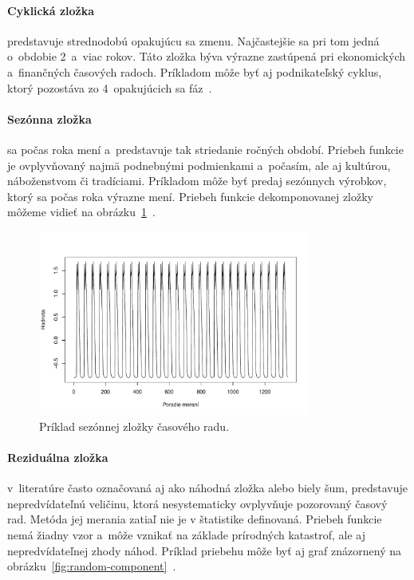 \documentclass[a4paper,twoside,slovak,12pt,appendix]{article}
\begin{document}
\paragraph{Cyklická zložka} predstavuje strednodobú opakujúcu sa zmenu.
Najčastejšie sa pri tom jedná o~obdobie 2~a~viac rokov. Táto zložka býva výrazne
zastúpená pri ekonomických a~finančných časových radoch. Príkladom môže byť
aj podnikateľský cyklus, ktorý pozostáva zo 4~opakujúcich sa
fáz~\cite{Agrawal2013}.

\paragraph{Sezónna zložka} sa počas roka mení a~predstavuje tak striedanie
ročných období. Priebeh funkcie je ovplyvňovaný najmä podnebnými podmienkami
a~počasím, ale aj kultúrou, náboženstvom či tradíciami. Príkladom môže byť
predaj sezónnych výrobkov, ktorý sa počas roka výrazne mení. Priebeh funkcie
dekomponovanej zložky môžeme vidieť na
obrázku~\ref{fig:seasonal-component}~\cite{Agrawal2013}.

\begin{figure}[H]
  \centering
  \includegraphics[width=0.8\textwidth]{season_component.pdf}
  \caption{Príklad sezónnej zložky časového radu.}
  \label{fig:seasonal-component}
\end{figure}

\paragraph{Reziduálna zložka} v~literatúre často označovaná aj ako náhodná
zložka alebo biely šum, predstavuje nepredvídateľnú veličinu, ktorá
nesystematicky ovplyvňuje pozorovaný časový rad. Metóda jej merania zatiaľ nie
je v štatistike definovaná. Priebeh funkcie nemá žiadny vzor a~môže vznikať na
základe prírodných katastrof, ale aj nepredvídateľnej zhody náhod. Príklad
priebehu môže byť aj graf znázornený na
obrázku~\ref{fig:random-component}~\cite{Agrawal2013}.
\end{document}
